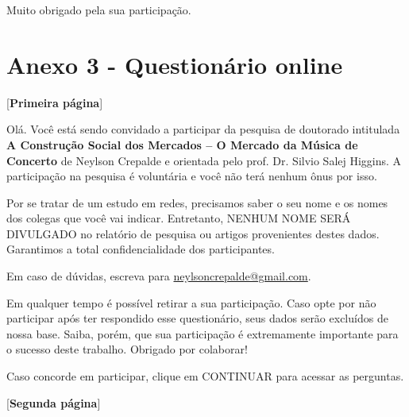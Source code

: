 \documentclass[a4paper, 12pt, openright, oneside, german, french, english, brazil]{abntex2}
\begin{document}
	Muito obrigado pela sua participação.









	\chapter*[Anexo 3]{Anexo 3 - Questionário online}




	[\textbf{Primeira página}]



	Olá. Você está sendo convidado a participar da pesquisa de doutorado intitulada \textbf{A Construção Social dos Mercados -- O Mercado da Música de Concerto} de Neylson Crepalde e orientada pelo prof. Dr. Silvio Salej Higgins. A participação na pesquisa é voluntária e você não terá nenhum ônus por isso.



	Por se tratar de um estudo em redes, precisamos saber o seu nome e os nomes dos colegas que você vai indicar. Entretanto, NENHUM NOME SERÁ DIVULGADO no relatório de pesquisa ou artigos provenientes destes dados. Garantimos a total confidencialidade dos participantes.



	Em caso de dúvidas, escreva para \url{neylsoncrepalde@gmail.com}.



	Em qualquer tempo é possível retirar a sua participação. Caso opte por não participar após ter respondido esse questionário, seus dados serão excluídos de nossa base. Saiba, porém, que sua participação é extremamente importante para o sucesso deste trabalho. Obrigado por colaborar!





	Caso concorde em participar, clique em CONTINUAR para acessar as perguntas.



	[\textbf{Segunda página}]
\end{document}
